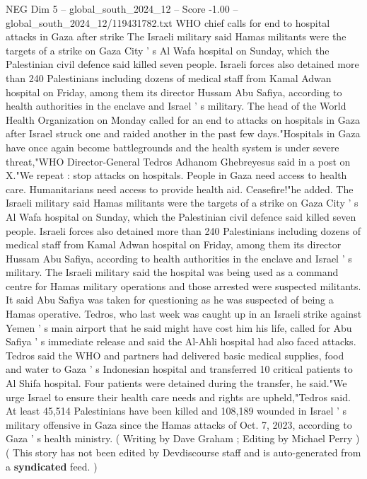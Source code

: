 \begin{textsample}{NEG Dim 5 – global\_south\_2024\_12 – Score -1.00 – global\_south\_2024\_12/119431782.txt}  \label{ex:f5_neg_403}
WHO chief calls for end to hospital attacks in Gaza after strike The Israeli military said Hamas militants were the targets of a strike on Gaza City ' s Al Wafa hospital on Sunday, which the Palestinian civil defence said killed seven people.
Israeli forces also detained more than 240 Palestinians including dozens of medical staff from Kamal Adwan hospital on Friday, among them its director Hussam Abu Safiya, according to health authorities in the enclave and Israel ' s military.
The head of the World Health Organization on Monday called for an end to attacks on hospitals in Gaza after Israel struck one and raided another in the past few days."Hospitals in Gaza have once again become battlegrounds and the health system is under severe threat,"WHO Director-General Tedros Adhanom Ghebreyesus said in a post on X."We repeat : stop attacks on hospitals.
People in Gaza need access to health care.
Humanitarians need access to provide health aid.
Ceasefire!"he added.
The Israeli military said Hamas militants were the targets of a strike on Gaza City ' s Al Wafa hospital on Sunday, which the Palestinian civil defence said killed seven people.
Israeli forces also detained more than 240 Palestinians including dozens of medical staff from Kamal Adwan hospital on Friday, among them its director Hussam Abu Safiya, according to health authorities in the enclave and Israel ' s military.
The Israeli military said the hospital was being used as a command centre for Hamas military operations and those arrested were suspected militants.
It said Abu Safiya was taken for questioning as he was suspected of being a Hamas operative.
Tedros, who last week was caught up in an Israeli strike against Yemen ' s main airport that he said might have cost him his life, called for Abu Safiya ' s immediate release and said the Al-Ahli hospital had also faced attacks.
Tedros said the WHO and partners had delivered basic medical supplies, food and water to Gaza ' s Indonesian hospital and transferred 10 critical patients to Al Shifa hospital.
Four patients were detained during the transfer, he said."We urge Israel to ensure their health care needs and rights are upheld,"Tedros said.
At least 45,514 Palestinians have been killed and 108,189 wounded in Israel ' s military offensive in Gaza since the Hamas attacks of Oct. 7, 2023, according to Gaza ' s health ministry. ( Writing by Dave Graham ; Editing by Michael Perry ) ( This story has not been edited by Devdiscourse staff and is auto-generated from a \textbf{syndicated} feed. )

\end{textsample}
